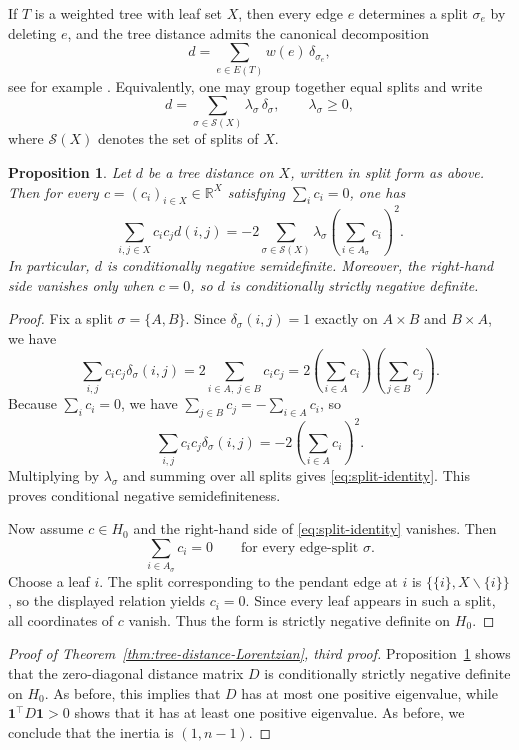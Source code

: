 \documentclass[12pt]{amsart}
\newtheorem{proposition}[theorem]{Proposition}
\theoremstyle{definition}
\newcommand{\1}{\mathbf{1}}
\newcommand\R{{\mathbb R}}
\renewcommand{\setminus}{\backslash}
\begin{document}
If $T$ is a weighted tree with leaf set $X$, then every edge $e$ determines a split
$\sigma_e$ by deleting $e$, and the tree distance admits the canonical decomposition
\[
d=
\sum_{e\in E(T)} w(e)\,\delta_{\sigma_e},
\]
see for example \cite{SempleSteel2003}.
Equivalently, one may group together equal splits and write
\[
d=\sum_{\sigma\in \mathcal S(X)} \lambda_\sigma\,\delta_\sigma,
\qquad
\lambda_\sigma\ge 0,
\]
where $\mathcal S(X)$ denotes the set of splits of $X$.

\begin{proposition}
\label{prop:split-CND}
Let $d$ be a tree distance on $X$, written in split form as above.  Then for every
$c=(c_i)_{i\in X}\in\R^X$ satisfying $\sum_i c_i=0$, one has
\begin{equation}
\label{eq:split-identity}
\sum_{i,j\in X} c_i c_j d(i,j)
=
-2\sum_{\sigma\in\mathcal S(X)} \lambda_\sigma
\left(\sum_{i\in A_\sigma} c_i\right)^2.
\end{equation}
In particular, $d$ is conditionally negative semidefinite.  Moreover, the right-hand
side vanishes only when $c=0$, so $d$ is conditionally strictly negative definite.
\end{proposition}

\begin{proof}
Fix a split $\sigma=\{A,B\}$.  Since $\delta_\sigma(i,j)=1$ exactly on
$A\times B$ and $B\times A$, we have
\[
\sum_{i,j} c_i c_j\delta_\sigma(i,j)
=
2\sum_{i\in A,\ j\in B} c_i c_j
=
2\left(\sum_{i\in A}c_i\right)\left(\sum_{j\in B}c_j\right).
\]
Because $\sum_i c_i=0$, we have $\sum_{j\in B}c_j=-\sum_{i\in A}c_i$, so
\[
\sum_{i,j} c_i c_j\delta_\sigma(i,j)
=
-2\left(\sum_{i\in A}c_i\right)^2.
\]
Multiplying by $\lambda_\sigma$ and summing over all splits gives
\eqref{eq:split-identity}.  This proves conditional negative semidefiniteness.

Now assume $c\in H_0$ and the right-hand side of \eqref{eq:split-identity} vanishes.
Then
\[
\sum_{i\in A_\sigma} c_i=0
\qquad\text{for every edge-split }\sigma.
\]
Choose a leaf $i$.  The split corresponding to the pendant edge at $i$ is
$\{\{i\},X\setminus\{i\}\}$, so the displayed relation yields $c_i=0$.  Since every
leaf appears in such a split, all coordinates of $c$ vanish.  Thus the form is strictly
negative definite on $H_0$.
\end{proof}

\begin{proof}[Proof of Theorem~\ref{thm:tree-distance-Lorentzian}, third proof]
Proposition~\ref{prop:split-CND} shows that the zero-diagonal distance matrix $D$ is
conditionally strictly negative definite on $H_0$.  As before, this implies that $D$
has at most one positive eigenvalue, while $\mathbf 1^\top D\mathbf 1>0$
shows that it has at least one positive eigenvalue.  
As before, we conclude that the inertia is $(1,n-1)$.
\end{proof}
\end{document}
